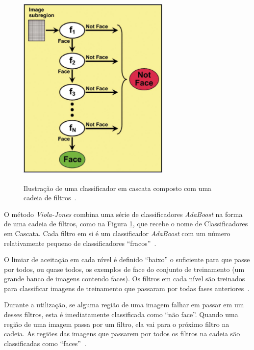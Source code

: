 	\begin{figure}[htb]
		\begin{center}
			\includegraphics[height=10cm,width=7.5cm]{figuras/2.FundamentacaoTeorica/filterchain.png}
		\end{center}
		\caption{Ilustração de uma classificador em cascata composto com uma cadeia de filtros~\cite{servodetection}.}
		\label{filterchain}
	\end{figure}

O método \textit{Viola-Jones} combina uma série de classificadores \textit{AdaBoost} na forma de uma cadeia de filtros, como na Figura \ref{filterchain}, que recebe o nome de Classificadores em Cascata. Cada filtro em si é um classificador \textit{AdaBoost} com um número relativamente pequeno de classificadores ``fracos''~\cite{servodetection}. 

O limiar de aceitação em cada nível é definido ``baixo'' o suficiente para que passe por todos, ou quase todos, os exemplos de face do conjunto de treinamento (um grande banco de imagens contendo faces). Os filtros em cada nível são treinados para classificar imagens de treinamento que passaram por todas fases anteriores~\cite{servodetection}.

Durante a utilização, se alguma região de uma imagem falhar em passar em um desses filtros, esta é imediatamente classificada como ``não face''. Quando uma região de uma imagem passa por um filtro, ela vai para o próximo filtro na cadeia. As regiões das imagens que passarem por todos os filtros na cadeia são classificadas como ``faces''~\cite{servodetection}.

